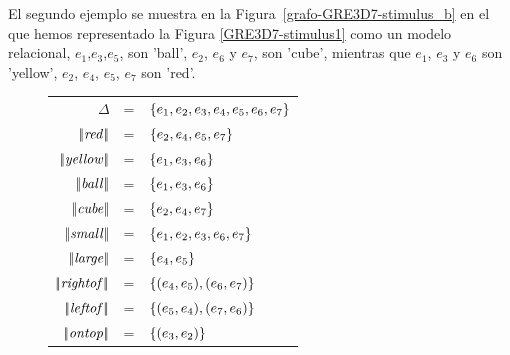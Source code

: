 El segundo ejemplo se muestra en la Figura~\ref{grafo-GRE3D7-stimulus_b} en el que hemos representado la Figura \ref{GRE3D7-stimulus1} 
como un modelo relacional, $e_1$,$e_3$,$e_5$, son 'ball', $e_2$, $e_6$ y $e_7$, son 'cube', mientras que 
$e_1$, $e_3$ y $e_6$ son 'yellow', $e_2$, $e_4$, $e_5$, $e_7$ son 'red'.


\begin{figure}
\begin{flushleft}
\begin{tabular}{rcl}
$\Delta$              & = & $\{e_1,e_2,e_3,e_4,e_5,e_6,e_7\}$\\
$|\!|\mathit{red}|\!|$      & = & $\{e_2,e_4,e_5,e_7\}$\\
$|\!|\mathit{yellow}|\!|$   & = & $\{e_1,e_3,e_6\}$\\
$|\!|\mathit{ball}|\!|$     & = & $\{e_1,e_3,e_6\}$\\
$|\!|\mathit{cube}|\!|$     & = & $\{e_2,e_4,e_7\}$\\

$|\!|\mathit{small}|\!|$    & = & $\{e_1,e_2,e_3,e_6,e_7\}$\\
$|\!|\mathit{large}|\!|$    & = & $\{e_4,e_5\}$\\

$|\!|\mathit{rightof}|\!|$   & = & $\{(e_4,e_5),(e_6,e_7)\}$\\
$|\!|\mathit{leftof}|\!|$    & = & $\{(e_5,e_4),(e_7,e_6)\}$\\
$|\!|\mathit{ontop}|\!|$     & = & $\{(e_3,e_2)\}$\\


\end{tabular}
\end{flushleft}
\end{figure}
